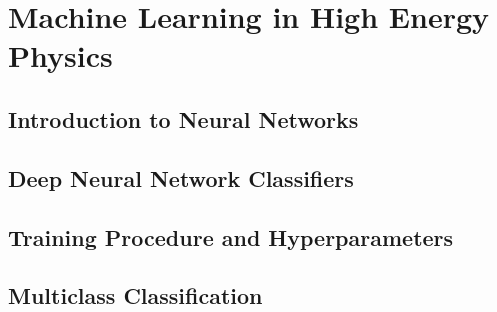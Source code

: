 \chapter{Machine Learning in High Energy Physics}
\label{chap:ml}

\section{Introduction to Neural Networks}
\section{Deep Neural Network Classifiers}
\section{Training Procedure and Hyperparameters}
\section{Multiclass Classification}

